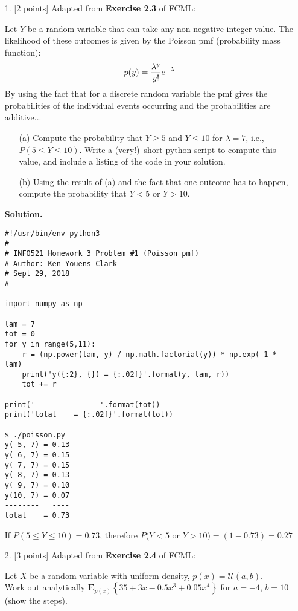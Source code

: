 \documentclass[10pt]{article}
\begin{document}
\newpage
\begin{itemize}

\item[1.] [2 points]
Adapted from {\bf Exercise 2.3} of FCML:

Let $Y$ be a random variable that can take any non-negative integer value.  The likelihood of these outcomes is given by the Poisson pmf (probability mass function):
\begin{eqnarray}
p(y) = {\lambda^y\over y!} e^{-\lambda}
\end{eqnarray}
By using the fact that for a discrete random variable the pmf gives the probabilities of the individual events occurring and the probabilities are additive...
\begin{enumerate}
\item[(a)] Compute the probability that $Y \geq 5$ and $Y \leq 10$ for $\lambda = 7$, i.e., $P(5 \leq Y \leq 10)$.  Write a (very!)~short python script to compute this value, and include a listing of the code in your solution.
\item[(b)] Using the result of (a) and the fact that one outcome has to happen, compute the probability that $Y < 5$ or $Y > 10$.
\end{enumerate}

{\bf Solution.} %

\begin{verbatim}
#!/usr/bin/env python3
#
# INFO521 Homework 3 Problem #1 (Poisson pmf)
# Author: Ken Youens-Clark
# Sept 29, 2018
#

import numpy as np

lam = 7
tot = 0
for y in range(5,11):
    r = (np.power(lam, y) / np.math.factorial(y)) * np.exp(-1 * lam)
    print('y({:2}, {}) = {:.02f}'.format(y, lam, r))
    tot += r

print('--------   ----'.format(tot))
print('total    = {:.02f}'.format(tot))

$ ./poisson.py
y( 5, 7) = 0.13
y( 6, 7) = 0.15
y( 7, 7) = 0.15
y( 8, 7) = 0.13
y( 9, 7) = 0.10
y(10, 7) = 0.07
--------   ----
total    = 0.73
\end{verbatim}

If $P(5 \leq Y \leq 10) = 0.73$, therefore $P(Y < 5$ or $Y > 10) = (1 - 0.73) = 0.27$

\item[2.] [3 points]
Adapted from {\bf Exercise 2.4} of FCML:

Let $X$ be a random variable with uniform density, $p(x) = \mathcal{U}(a,b)$.  \\
Work out analytically $\mathbf{E}_{p(x)} \left\{ 35 + 3x - 0.5x^3 + 0.05x^4 \right\}$ for $a=-4$, $b=10$ (show the steps).  


\end{itemize}
\end{document}
